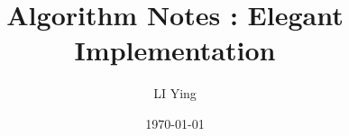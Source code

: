 \documentclass[letterpaper, oneside, 12pt]{report}
\author{LI Ying}
\date{\today}
\title{Algorithm Notes : Elegant Implementation}
\begin{document}
\maketitle
\pagebreak















\nocite{*}

\end{document}
